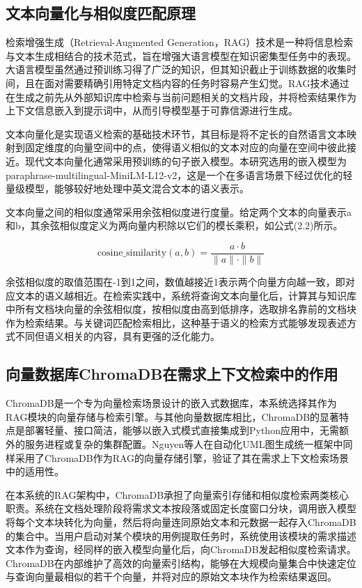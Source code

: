 \subsection{文本向量化与相似度匹配原理}

检索增强生成（Retrieval-Augmented Generation，RAG）技术是一种将信息检索与文本生成相结合的技术范式，旨在增强大语言模型在知识密集型任务中的表现。大语言模型虽然通过预训练习得了广泛的知识，但其知识截止于训练数据的收集时间，且在面对需要精确引用特定文档内容的任务时容易产生幻觉。RAG技术通过在生成之前先从外部知识库中检索与当前问题相关的文档片段，并将检索结果作为上下文信息嵌入到提示词中，从而引导模型基于可靠信源进行生成。

文本向量化是实现语义检索的基础技术环节，其目标是将不定长的自然语言文本映射到固定维度的向量空间中的点，使得语义相似的文本对应的向量在空间中彼此接近。现代文本向量化通常采用预训练的句子嵌入模型。本研究选用的嵌入模型为paraphrase-multilingual-MiniLM-L12-v2，这是一个在多语言场景下经过优化的轻量级模型，能够较好地处理中英文混合文本的语义表示。

文本向量之间的相似度通常采用余弦相似度进行度量。给定两个文本的向量表示a和b，其余弦相似度定义为两向量内积除以它们的模长乘积，如公式(2.2)所示。

\begin{equation}
    \text{cosine\_similarity}(a, b) = \frac{a \cdot b}{\|a\| \cdot \|b\|}
    \label{eq:cosine}
\end{equation}

余弦相似度的取值范围在-1到1之间，数值越接近1表示两个向量方向越一致，即对应文本的语义越相近。在检索实践中，系统将查询文本向量化后，计算其与知识库中所有文档块向量的余弦相似度，按相似度由高到低排序，选取排名靠前的文档块作为检索结果。与关键词匹配检索相比，这种基于语义的检索方式能够发现表述方式不同但语义相关的内容，具有更强的泛化能力。

\subsection{向量数据库ChromaDB在需求上下文检索中的作用}

ChromaDB是一个专为向量检索场景设计的嵌入式数据库，本系统选择其作为RAG模块的向量存储与检索引擎。与其他向量数据库相比，ChromaDB的显著特点是部署轻量、接口简洁，能够以嵌入式模式直接集成到Python应用中，无需额外的服务进程或复杂的集群配置。Nguyen等人\cite{nguyen2026novel}在自动化UML图生成统一框架中同样采用了ChromaDB作为RAG的向量存储引擎，验证了其在需求上下文检索场景中的适用性。

在本系统的RAG架构中，ChromaDB承担了向量索引存储和相似度检索两类核心职责。系统在文档处理阶段将需求文本按段落或固定长度窗口分块，调用嵌入模型将每个文本块转化为向量，然后将向量连同原始文本和元数据一起存入ChromaDB的集合中。当用户启动对某个模块的用例提取任务时，系统使用该模块的需求描述文本作为查询，经同样的嵌入模型向量化后，向ChromaDB发起相似度检索请求。ChromaDB在内部维护了高效的向量索引结构，能够在大规模向量集合中快速定位与查询向量最相似的若干个向量，并将对应的原始文本块作为检索结果返回。

